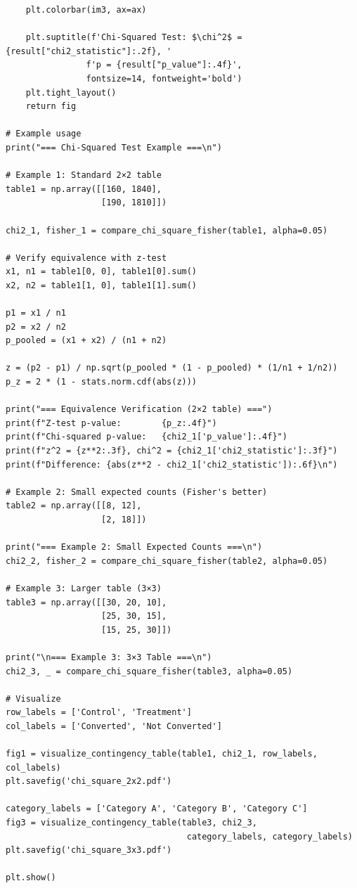 \begin{lstlisting}
    plt.colorbar(im3, ax=ax)

    plt.suptitle(f'Chi-Squared Test: $\chi^2$ = {result["chi2_statistic"]:.2f}, '
                f'p = {result["p_value"]:.4f}',
                fontsize=14, fontweight='bold')
    plt.tight_layout()
    return fig

# Example usage
print("=== Chi-Squared Test Example ===\n")

# Example 1: Standard 2×2 table
table1 = np.array([[160, 1840],
                   [190, 1810]])

chi2_1, fisher_1 = compare_chi_square_fisher(table1, alpha=0.05)

# Verify equivalence with z-test
x1, n1 = table1[0, 0], table1[0].sum()
x2, n2 = table1[1, 0], table1[1].sum()

p1 = x1 / n1
p2 = x2 / n2
p_pooled = (x1 + x2) / (n1 + n2)

z = (p2 - p1) / np.sqrt(p_pooled * (1 - p_pooled) * (1/n1 + 1/n2))
p_z = 2 * (1 - stats.norm.cdf(abs(z)))

print("=== Equivalence Verification (2×2 table) ===")
print(f"Z-test p-value:        {p_z:.4f}")
print(f"Chi-squared p-value:   {chi2_1['p_value']:.4f}")
print(f"z^2 = {z**2:.3f}, chi^2 = {chi2_1['chi2_statistic']:.3f}")
print(f"Difference: {abs(z**2 - chi2_1['chi2_statistic']):.6f}\n")

# Example 2: Small expected counts (Fisher's better)
table2 = np.array([[8, 12],
                   [2, 18]])

print("=== Example 2: Small Expected Counts ===\n")
chi2_2, fisher_2 = compare_chi_square_fisher(table2, alpha=0.05)

# Example 3: Larger table (3×3)
table3 = np.array([[30, 20, 10],
                   [25, 30, 15],
                   [15, 25, 30]])

print("\n=== Example 3: 3×3 Table ===\n")
chi2_3, _ = compare_chi_square_fisher(table3, alpha=0.05)

# Visualize
row_labels = ['Control', 'Treatment']
col_labels = ['Converted', 'Not Converted']

fig1 = visualize_contingency_table(table1, chi2_1, row_labels, col_labels)
plt.savefig('chi_square_2x2.pdf')

category_labels = ['Category A', 'Category B', 'Category C']
fig3 = visualize_contingency_table(table3, chi2_3,
                                    category_labels, category_labels)
plt.savefig('chi_square_3x3.pdf')

plt.show()
\end{lstlisting}


